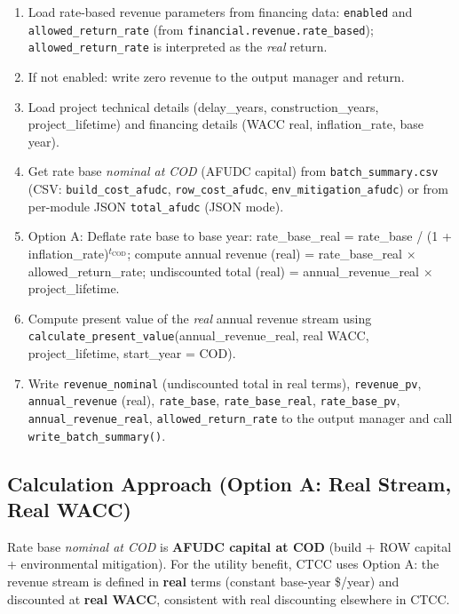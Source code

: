 \documentclass[ctcc_full_documentation.tex]{subfiles}
\begin{document}
\begin{enumerate}
    \item Load rate-based revenue parameters from financing data: \texttt{enabled} and \texttt{allowed\_return\_rate} (from \texttt{financial.revenue.rate\_based}); \texttt{allowed\_return\_rate} is interpreted as the \emph{real} return.
    \item If not enabled: write zero revenue to the output manager and return.
    \item Load project technical details (delay\_years, construction\_years, project\_lifetime) and financing details (WACC real, inflation\_rate, base year).
    \item Get rate base \emph{nominal at COD} (AFUDC capital) from \texttt{batch\_summary.csv} (CSV: \texttt{build\_cost\_afudc}, \texttt{row\_cost\_afudc}, \texttt{env\_mitigation\_afudc}) or from per-module JSON \texttt{total\_afudc} (JSON mode).
    \item Option A: Deflate rate base to base year: rate\_base\_real = rate\_base / (1 + inflation\_rate)$^{t_{\mathrm{COD}}}$; compute annual revenue (real) = rate\_base\_real $\times$ allowed\_return\_rate; undiscounted total (real) = annual\_revenue\_real $\times$ project\_lifetime.
    \item Compute present value of the \emph{real} annual revenue stream using \texttt{calculate\_present\_value}(annual\_revenue\_real, real WACC, project\_lifetime, start\_year = COD).
    \item Write \texttt{revenue\_nominal} (undiscounted total in real terms), \texttt{revenue\_pv}, \texttt{annual\_revenue} (real), \texttt{rate\_base}, \texttt{rate\_base\_real}, \texttt{rate\_base\_pv}, \texttt{annual\_revenue\_real}, \texttt{allowed\_return\_rate} to the output manager and call \texttt{write\_batch\_summary()}.
\end{enumerate}

\subsection{Calculation Approach (Option A: Real Stream, Real WACC)}

Rate base \emph{nominal at COD} is \textbf{AFUDC capital at COD} (build + ROW capital + environmental mitigation). For the utility benefit, CTCC uses Option A: the revenue stream is defined in \textbf{real} terms (constant base-year \$/year) and discounted at \textbf{real WACC}, consistent with real discounting elsewhere in CTCC.
\end{document}
